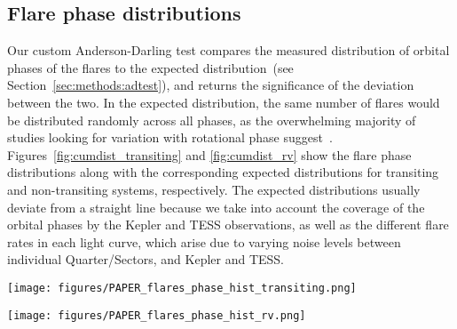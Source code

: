 \documentclass[twocolumn]{aastex631}
\begin{document}
\subsection{Flare phase distributions}
\label{sec:results:phasedist}
Our custom Anderson-Darling test compares the measured distribution of orbital phases of the flares to the expected distribution~(see Section~\ref{sec:methods:adtest}), and returns the significance of the deviation between the two. In the expected distribution, the same number of flares would be distributed randomly across all phases, as the overwhelming majority of studies looking for variation with rotational phase suggest~\citep[see, e.g.,][]{doyle2018investigating,howard2021evryflare}. Figures~\ref{fig:cumdist_transiting} and \ref{fig:cumdist_rv} show the flare phase distributions along with the corresponding expected distributions for transiting and non-transiting systems, respectively. The expected distributions usually deviate from a straight line because we take into account the coverage of the orbital phases by the Kepler and TESS observations, as well as the different flare rates in each light curve, which arise due to varying noise levels between individual Quarter/Sectors, and Kepler and TESS.

\begin{figure*}[ht!]
    \begin{centering}
        \texttt{[image: figures/PAPER\_flares\_phase\_hist\_transiting.png]}
        \caption{
            Cumulative distributions of orbital phases of flares in the \textit{transiting} planet hosts observed by Kepler and TESS, sorted by number of flares from top to bottom. The bisector line is dotted, the expected distribution is solid blue, and the observed distribution is solid black. Phase zero corresponds to the transit mid-time of the planet. 
        }
        \label{fig:cumdist_transiting}
    \end{centering}
\end{figure*}

\begin{figure*}[ht!]
    \begin{centering}
        \texttt{[image: figures/PAPER\_flares\_phase\_hist\_rv.png]}
        \caption{
            Cumulative distributions of orbital phases of flares in the \textit{non-transiting} planet hosts observed by Kepler and TESS, sorted by number of flares from top to bottom. The bisector line is dotted, the expected distribution is solid blue, and the observed distribution is solid black. Phase zero is chosen arbitrarily. 
        }
        \label{fig:cumdist_rv}
    \end{centering}
\end{figure*}
\end{document}
